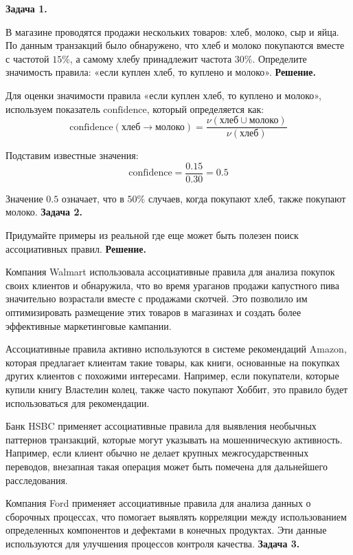 \textbf{Задача 1.}

В магазине проводятся продажи нескольких товаров: хлеб, молоко, сыр и яйца. По данным транзакций было обнаружено, что хлеб и молоко покупаются вместе с частотой $15\%$, а самому хлебу принадлежит частота $30\%$. Определите значимость правила: «если куплен хлеб, то куплено и молоко».
\newline
\textbf{Решение.}

Для оценки значимости правила «если куплен хлеб, то куплено и молоко», используем показатель \(\text{confidence}\), который определяется как:
\[
\text{confidence}(\text{хлеб} \rightarrow \text{молоко}) = \frac{\nu(\text{хлеб} \cup \text{молоко})}{\nu(\text{хлеб})}
\]

Подставим известные значения:
\[
\text{confidence} = \frac{0.15}{0.30} = 0.5
\]

Значение $0.5$ означает, что в $50\%$ случаев, когда покупают хлеб, также покупают молоко.
\newline
\textbf{Задача 2.}

Придумайте примеры из реальной где еще может быть полезен поиск ассоциативных правил.
\newline
\textbf{Решение.}

Компания Walmart использовала ассоциативные правила для анализа покупок своих клиентов и обнаружила, что во время ураганов продажи капустного пива значительно возрастали вместе с продажами скотчей. Это позволило им оптимизировать размещение этих товаров в магазинах и создать более эффективные маркетинговые кампании.

Ассоциативные правила активно используются в системе рекомендаций Amazon, которая предлагает клиентам такие товары, как книги, основанные на покупках других клиентов с похожими интересами. Например, если покупатели, которые купили книгу Властелин колец, также часто покупают Хоббит, это правило будет использоваться для рекомендации.

Банк HSBC применяет ассоциативные правила для выявления необычных паттернов транзакций, которые могут указывать на мошенническую активность. Например, если клиент обычно не делает крупных межгосударственных переводов, внезапная такая операция может быть помечена для дальнейшего расследования.

Компания Ford применяет ассоциативные правила для анализа данных о сборочных процессах, что помогает выявлять корреляции между использованием определенных компонентов и дефектами в конечных продуктах. Эти данные используются для улучшения процессов контроля качества.
\newline
\textbf{Задача 3.}

